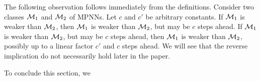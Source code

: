 The following observation follows immediately from the definitions. Consider two classes $\mathcal{M}_1$ and $\mathcal{M}_2$ of MPNNs. Let $c$ and $c'$ be arbitrary
constants.
If $\mathcal{M}_1$ is weaker than $\mathcal{M}_2$, then $\mathcal{M}_1$ is weaker than $\mathcal{M}_2$, but may be $c$ steps ahead. If $\mathcal{M}_1$ is weaker than $\mathcal{M}_2$, but may be $c$ steps ahead, then $\mathcal{M}_1$ is weaker than $\mathcal{M}_2$, possibly up to a linear factor $c'$  and $c$ steps ahead. We will see that the reverse implication do not necessarily hold later in the paper.

To conclude this section, we 






